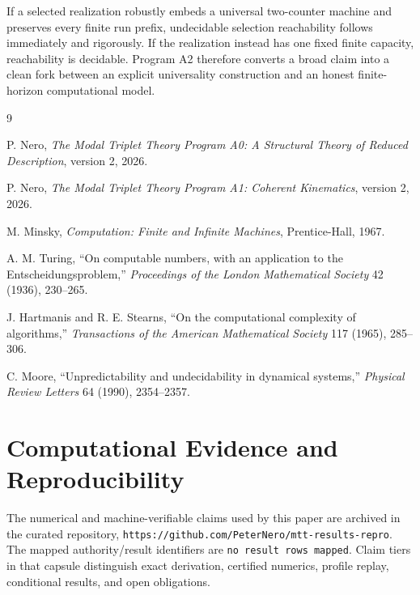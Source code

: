 \documentclass[11pt]{article}
\begin{document}
If a selected realization robustly embeds a universal two-counter machine and
preserves every finite run prefix, undecidable selection reachability follows
immediately and rigorously.  If the realization instead has one fixed finite
capacity, reachability is decidable.  Program A2 therefore converts a broad
claim into a clean fork between an explicit universality construction and an
honest finite-horizon computational model.

\begin{thebibliography}{9}

P. Nero,
\emph{The Modal Triplet Theory Program A0: A Structural Theory of Reduced
Description}, version 2, 2026.

P. Nero,
\emph{The Modal Triplet Theory Program A1: Coherent Kinematics}, version 2,
2026.

M. Minsky,
\emph{Computation: Finite and Infinite Machines},
Prentice-Hall, 1967.

A. M. Turing,
``On computable numbers, with an application to the
Entscheidungsproblem,''
\emph{Proceedings of the London Mathematical Society} 42 (1936), 230--265.

J. Hartmanis and R. E. Stearns,
``On the computational complexity of algorithms,''
\emph{Transactions of the American Mathematical Society} 117 (1965), 285--306.

C. Moore,
``Unpredictability and undecidability in dynamical systems,''
\emph{Physical Review Letters} 64 (1990), 2354--2357.

\end{thebibliography}

\section*{Computational Evidence and Reproducibility}
The numerical and machine-verifiable claims used by this paper are archived in the curated repository, \texttt{https://github.com/PeterNero/mtt-results-repro}. The mapped authority/result identifiers are \texttt{no result rows mapped}. Claim tiers in that capsule distinguish exact derivation, certified numerics, profile replay, conditional results, and open obligations.
\end{document}

